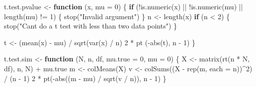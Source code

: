 \documentclass[
  letterpaper,
  DIV=11,
  numbers=noendperiod]{scrreprt}
\newenvironment{Shaded}{\begin{snugshade}}{\end{snugshade}}
\newcommand{\AttributeTok}[1]{\textcolor[rgb]{0.40,0.45,0.13}{#1}}
\newcommand{\ControlFlowTok}[1]{\textcolor[rgb]{0.00,0.23,0.31}{\textbf{#1}}}
\newcommand{\DecValTok}[1]{\textcolor[rgb]{0.68,0.00,0.00}{#1}}
\newcommand{\FunctionTok}[1]{\textcolor[rgb]{0.28,0.35,0.67}{#1}}
\newcommand{\NormalTok}[1]{\textcolor[rgb]{0.00,0.23,0.31}{#1}}
\newcommand{\OtherTok}[1]{\textcolor[rgb]{0.00,0.23,0.31}{#1}}
\newcommand{\SpecialCharTok}[1]{\textcolor[rgb]{0.37,0.37,0.37}{#1}}
\newcommand{\StringTok}[1]{\textcolor[rgb]{0.13,0.47,0.30}{#1}}
\begin{document}
\begin{Shaded}
\begin{Highlighting}[]
\NormalTok{t.test.pvalue }\OtherTok{\textless{}{-}} \ControlFlowTok{function}\NormalTok{ (x, }\AttributeTok{mu =} \DecValTok{0}\NormalTok{)}
\NormalTok{\{}
    \ControlFlowTok{if}\NormalTok{ (}\SpecialCharTok{!}\FunctionTok{is.numeric}\NormalTok{(x) }\SpecialCharTok{||} \SpecialCharTok{!}\FunctionTok{is.numeric}\NormalTok{(mu) }\SpecialCharTok{||} \FunctionTok{length}\NormalTok{(mu) }\SpecialCharTok{!=} \DecValTok{1}\NormalTok{) \{ }\FunctionTok{stop}\NormalTok{(}\StringTok{"Invalid argument"}\NormalTok{) \}}
\NormalTok{    n }\OtherTok{\textless{}{-}} \FunctionTok{length}\NormalTok{(x)}
    \ControlFlowTok{if}\NormalTok{ (n }\SpecialCharTok{\textless{}} \DecValTok{2}\NormalTok{) \{ }\FunctionTok{stop}\NormalTok{(}\StringTok{"Can\textquotesingle{}t do a t test with less than two data points"}\NormalTok{) \}}
    
\NormalTok{    t }\OtherTok{\textless{}{-}}\NormalTok{ (}\FunctionTok{mean}\NormalTok{(x) }\SpecialCharTok{{-}}\NormalTok{ mu) }\SpecialCharTok{/} \FunctionTok{sqrt}\NormalTok{(}\FunctionTok{var}\NormalTok{(x) }\SpecialCharTok{/}\NormalTok{ n)}
    \DecValTok{2} \SpecialCharTok{*} \FunctionTok{pt}\NormalTok{ (}\SpecialCharTok{{-}}\FunctionTok{abs}\NormalTok{(t), n }\SpecialCharTok{{-}} \DecValTok{1}\NormalTok{)}
\NormalTok{\}}

\NormalTok{t.test.sim }\OtherTok{\textless{}{-}} \ControlFlowTok{function}\NormalTok{ (N, n, df, }\AttributeTok{mu.true =} \DecValTok{0}\NormalTok{, }\AttributeTok{mu =} \DecValTok{0}\NormalTok{)}
\NormalTok{\{}
\NormalTok{    X }\OtherTok{\textless{}{-}} \FunctionTok{matrix}\NormalTok{(}\FunctionTok{rt}\NormalTok{(n }\SpecialCharTok{*}\NormalTok{ N, df), n, N) }\SpecialCharTok{+}\NormalTok{ mu.true}
\NormalTok{    m }\OtherTok{\textless{}{-}} \FunctionTok{colMeans}\NormalTok{(X)}
\NormalTok{    v }\OtherTok{\textless{}{-}} \FunctionTok{colSums}\NormalTok{((X }\SpecialCharTok{{-}} \FunctionTok{rep}\NormalTok{(m, }\AttributeTok{each =}\NormalTok{ n))}\SpecialCharTok{\^{}}\DecValTok{2}\NormalTok{) }\SpecialCharTok{/}\NormalTok{ (n }\SpecialCharTok{{-}} \DecValTok{1}\NormalTok{)}
    \DecValTok{2} \SpecialCharTok{*} \FunctionTok{pt}\NormalTok{(}\SpecialCharTok{{-}}\FunctionTok{abs}\NormalTok{((m }\SpecialCharTok{{-}}\NormalTok{ mu) }\SpecialCharTok{/} \FunctionTok{sqrt}\NormalTok{(v }\SpecialCharTok{/}\NormalTok{ n)), n }\SpecialCharTok{{-}} \DecValTok{1}\NormalTok{)}
\NormalTok{\}}


\end{Highlighting}
\end{Shaded}
\end{document}

